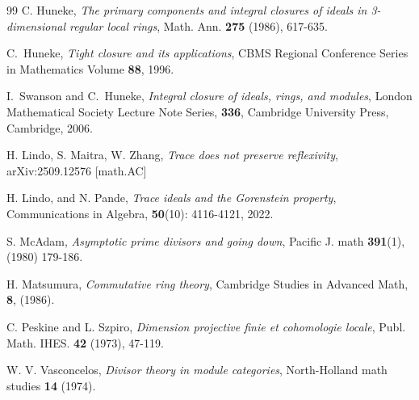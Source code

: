 \documentclass[11pt,a4paper]{amsart}
\numberwithin{equation}{section}
\begin{document}
\begin{thebibliography}{99}
C. Huneke, \emph{
	The primary components and integral closures of ideals in 3-dimensional regular local rings}, Math. Ann.  {\bf{275}} (1986), 617-635.


   {C.~Huneke}, \emph{Tight closure and its applications}, CBMS Regional Conference Series in Mathematics
Volume {\bf88}, 1996.


 
 {I.~Swanson} and {C.~Huneke}, \emph{Integral closure of ideals, rings, and
	modules}, London Mathematical Society Lecture Note Series, {\bf
	336}, Cambridge University Press, Cambridge, 2006.

H. Lindo, S. Maitra, W. Zhang, \emph{
Trace does not preserve reflexivity}, 	arXiv:2509.12576 [math.AC]

H. Lindo,
 and N. Pande, \emph{Trace ideals and the Gorenstein property}, Communications in Algebra, {\bf50}(10): 4116-4121, 2022.
 
  S. McAdam, \emph{Asymptotic prime divisors and going down}, Pacific J. math {\bf
 	391}(1), (1980) 179-186.
 
H. Matsumura, \emph{Commutative ring theory}, Cambridge Studies in Advanced Math, \textbf{8}, (1986).

C. Peskine and L. Szpiro, \emph{Dimension projective finie et cohomologie locale},
Publ. Math. IHES. 
{\bf42} 
(1973),  47-119.


  W. V. Vasconcelos, \emph{Divisor theory in module categories}, 
North-Holland math studies  {\bf{14}} (1974).
 \end{thebibliography}


	 
\end{document}
